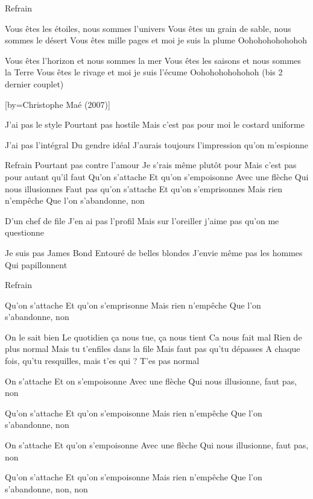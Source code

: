 \beginverse
Refrain
\endverse

\beginverse
Vous êtes les étoiles, nous sommes l'univers
Vous êtes un grain de sable, nous sommes le désert
Vous êtes mille pages et moi je suis la plume
Oohohohohohohoh
\endverse

\beginverse
Vous êtes l'horizon et nous sommes la mer
Vous êtes les saisons et nous sommes la Terre
Vous êtes le rivage et moi je suis l'écume
Oohohohohohohoh
(bis 2 dernier couplet)
\endverse

[by={Christophe Maé (2007)}]

\beginverse
J'ai pas le style
Pourtant pas hostile
Mais c'est pas pour moi le costard uniforme
\endverse

\beginverse
J'ai pas l'intégral
Du gendre idéal
J'aurais toujours l'impression qu'on m'espionne
\endverse

\beginverse
Refrain
Pourtant pas contre l'amour
Je s'rais même plutôt pour
Mais c'est pas pour autant qu'il faut
Qu'on s'attache
Et qu'on s'empoisonne
Avec une flèche
Qui nous illusionnes
Faut pas qu'on s'attache
Et qu'on s'emprisonnes
Mais rien n'empêche
Que l'on s'abandonne, non \!
\endverse

\beginverse
D'un chef de file
J'en ai pas l'profil
Mais sur l'oreiller j'aime pas qu'on me questionne
\endverse

\beginverse
Je suis pas James Bond
Entouré de belles blondes
J'envie même pas les hommes
Qui papillonnent
\endverse

\beginverse
Refrain
\endverse

\beginverse
Qu'on s'attache
Et qu'on s'emprisonne
Mais rien n'empêche
Que l'on s'abandonne, non
\endverse

\beginverse
On le sait bien
Le quotidien ça nous tue, ça nous tient
Ca nous fait mal
Rien de plus normal
Mais tu t'enfiles dans la file
Mais faut pas qu'tu dépasses
A chaque fois, qu'tu resquilles, mais t'es qui ?
T'es pas normal
\endverse

\beginverse
On s'attache
Et on s'empoisonne
Avec une flèche
Qui nous illusionne, faut pas, non
\endverse

\beginverse
Qu'on s'attache
Et qu'on s'empoisonne
Mais rien n'empêche
Que l'on s'abandonne, non \!
\endverse

\beginverse
On s'attache
Et qu'on s'empoisonne
Avec une flèche
Qui nous illusionne, faut pas, non
\endverse

\beginverse
Qu'on s'attache
Et qu'on s'empoisonne
Mais rien n'empêche
Que l'on s'abandonne, non, non \!
\endverse

